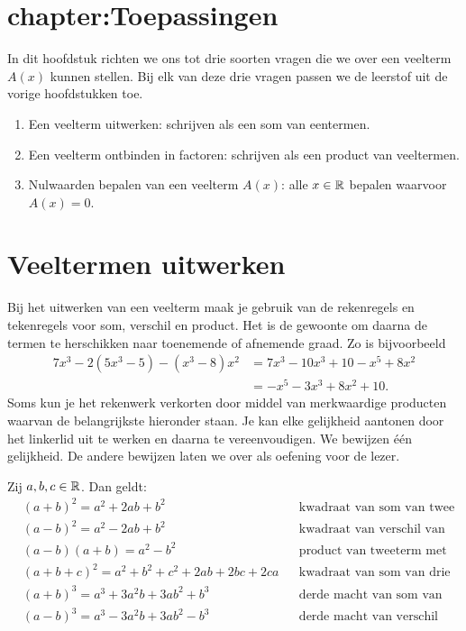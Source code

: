 \documentclass{ximera}
\begin{document}
\section{chapter:Toepassingen}

In dit hoofdstuk richten we ons tot drie soorten vragen die we over een veelterm $A(x)$ kunnen stellen. Bij elk van deze drie vragen passen we de leerstof uit de vorige hoofdstukken toe. 
\begin{enumerate}[(1)]
\item
Een veelterm uitwerken: schrijven als een som van eentermen. 
\item
Een veelterm ontbinden in factoren: schrijven als een product van veeltermen.
\item
Nulwaarden bepalen van een veelterm $A(x)$: alle $x \in \mathbb{R}$ bepalen waarvoor $A(x) = 0$. 
\end{enumerate}














\section{Veeltermen uitwerken}

Bij het uitwerken van een veelterm maak je gebruik van de rekenregels en tekenregels voor som, verschil en product. Het is de gewoonte om daarna de termen te herschikken naar toenemende of afnemende graad. Zo is bijvoorbeeld
\begin{align*}
7x^3-2(5x^3-5)-(x^3-8)x^2 & = 7x^3 - 10x^3 + 10 - x^5 + 8x^2 \\
& = -x^5 - 3x^3 + 8x^2 + 10.
\end{align*}
Soms kun je het rekenwerk verkorten door middel van merkwaardige producten
waarvan de belangrijkste hieronder staan. Je kan elke gelijkheid aantonen door het linkerlid uit te werken en daarna te vereenvoudigen. We bewijzen \'e\'en gelijkheid. De andere bewijzen laten we over als oefening voor de lezer. 

\begin{proposition} 
Zij $a,b,c \in \mathbb{R}$. Dan geldt:
\begin{align*}
& (a+b)^2 = a^2+2ab+b^2 && \text{kwadraat van som van twee termen} \\
& (a-b)^2 = a^2-2ab+b^2 && \text{kwadraat van verschil van twee termen} \\
& (a-b)(a+b) = a^2-b^2 && \text{product van tweeterm met zijn toegevoegde} \\
& (a+b+c)^2 = a^2 + b^2 + c^2 + 2ab + 2bc + 2ca && \text{kwadraat van som van drie termen} \\
& (a+b)^3 = a^3+3a^2b+3ab^2+b^3 && \text{derde macht van som van twee termen} \\
& (a-b)^3 = a^3-3a^2b+3ab^2-b^3 && \text{derde macht van verschil van twee termen.}
\end{align*}
\end{proposition} 
\end{document}
